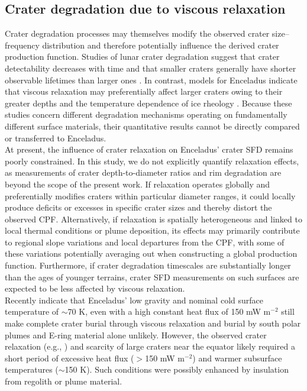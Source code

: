 \documentclass[preprint,11pt,3p,times,authoryear]{elsarticle}
\begin{document}
\subsection{Crater degradation due to viscous relaxation}
\label{subsec:relax}
Crater degradation processes may themselves modify the observed crater size--frequency distribution and therefore potentially influence the derived crater production function. Studies of lunar crater degradation suggest that crater detectability decreases with time and that smaller craters generally have shorter observable lifetimes than larger ones \citep{Fassett2014,Fassett2022}. In contrast, models for Enceladus indicate that viscous relaxation may preferentially affect larger craters owing to their greater depths and the temperature dependence of ice rheology \citep{Bland2012}. Because these studies concern different degradation mechanisms operating on fundamentally different surface materials, their quantitative results cannot be directly compared or transferred to Enceladus.\\

At present, the influence of crater relaxation on Enceladus' crater SFD remains poorly constrained. In this study, we do not explicitly quantify relaxation effects, as measurements of crater depth-to-diameter ratios and rim degradation are beyond the scope of the present work. If relaxation operates globally and preferentially modifies craters within particular diameter ranges, it could locally produce deficits or excesses in specific crater sizes and thereby distort the observed CPF. Alternatively, if relaxation is spatially heterogeneous and linked to local thermal conditions or plume deposition, its effects may primarily contribute to regional slope variations and local departures from the CPF, with some of these variations potentially averaging out when constructing a global production function. Furthermore, if crater degradation timescales are substantially longer than the ages of younger terrains, crater SFD measurements on such surfaces are expected to be less affected by viscous relaxation.\\

Recently \citet{Bland2012,Martin2023} indicate that Enceladus’ low gravity and nominal cold surface temperature of $\sim$70 K, even with a high constant heat flux of 150 mW m$^{-2}$ still make complete crater burial through viscous relaxation and burial by south polar plumes and E-ring material alone unlikely. However, the observed crater relaxation (e.g., \citealt{Bland2012}) and scarcity of large craters near the equator likely required a short period of excessive heat flux ($>$150 mW m$^{-2}$) and warmer subsurface temperatures ($\sim$150 K). Such conditions were possibly enhanced by insulation from regolith or plume material.\\
\end{document}
